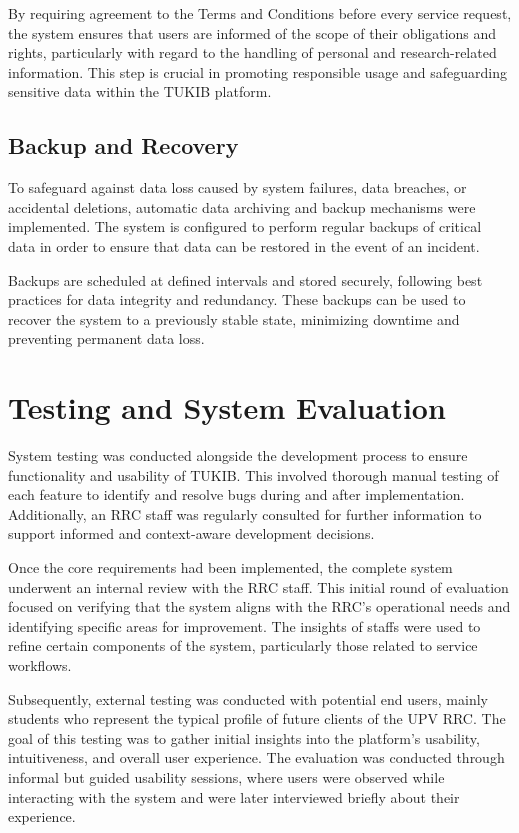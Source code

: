 By requiring agreement to the Terms and Conditions before every service request, the system ensures that users are informed of the scope of their obligations and rights, particularly with regard to the handling of personal and research-related information. This step is crucial in promoting responsible usage and safeguarding sensitive data within the TUKIB platform.

\subsection{Backup and Recovery}

To safeguard against data loss caused by system failures, data breaches, or accidental deletions, automatic data archiving and backup mechanisms were implemented. The system is configured to perform regular backups of critical data in order to ensure that data can be restored in the event of an incident.

Backups are scheduled at defined intervals and stored securely, following best practices for data integrity and redundancy. These backups can be used to recover the system to a previously stable state, minimizing downtime and preventing permanent data loss. 

\section{Testing and System Evaluation}

System testing was conducted alongside the development process to ensure functionality and usability of TUKIB. This involved thorough manual testing of each feature to identify and resolve bugs during and after implementation. Additionally, an RRC staff was regularly consulted for further information to support informed and context-aware development decisions.

Once the core requirements had been implemented, the complete system underwent an internal review with the RRC staff. This initial round of evaluation focused on verifying that the system aligns with the RRC's operational needs and identifying specific areas for improvement. The insights of staffs were used to refine certain components of the system, particularly those related to service workflows. 

Subsequently, external testing was conducted with potential end users, mainly students who represent the typical profile of future clients of the UPV RRC. The goal of this testing was to gather initial insights into the platform's usability, intuitiveness, and overall user experience. The evaluation was conducted through informal but guided usability sessions, where users were observed while interacting with the system and were later interviewed briefly about their experience.

